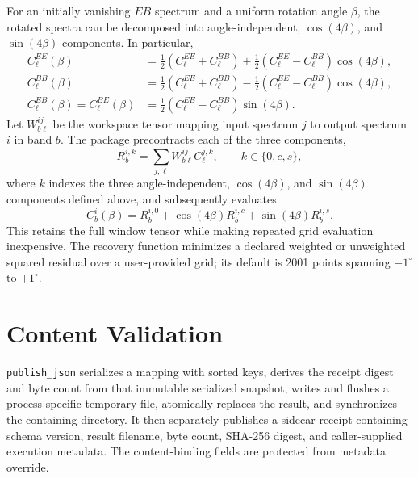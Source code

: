\documentclass[11pt]{article}
\begin{document}
For an initially vanishing \(EB\) spectrum and a uniform rotation angle
\(\beta\), the rotated spectra can be decomposed into angle-independent,
\(\cos(4\beta)\), and \(\sin(4\beta)\) components.  In particular,
\begin{align}
 C_\ell^{EE}(\beta)
   &= \tfrac12(C_\ell^{EE}+C_\ell^{BB})
    + \tfrac12(C_\ell^{EE}-C_\ell^{BB})\cos(4\beta),\\
 C_\ell^{BB}(\beta)
   &= \tfrac12(C_\ell^{EE}+C_\ell^{BB})
    - \tfrac12(C_\ell^{EE}-C_\ell^{BB})\cos(4\beta),\\
 C_\ell^{EB}(\beta)=C_\ell^{BE}(\beta)
   &= \tfrac12(C_\ell^{EE}-C_\ell^{BB})\sin(4\beta).
\end{align}
Let \(W_{b\ell}^{ij}\) be the workspace tensor mapping input spectrum \(j\)
to output spectrum \(i\) in band \(b\).  The package precontracts each of the
three components,
\begin{equation}
 R_{b}^{i,k}=\sum_{j,\ell}W_{b\ell}^{ij}C_\ell^{j,k},\qquad k\in\{0,c,s\},
\end{equation}
where \(k\) indexes the three angle-independent, \(\cos(4\beta)\), and
\(\sin(4\beta)\) components defined above, and subsequently evaluates
\begin{equation}
 C_b^i(\beta)=R_b^{i,0}
 +\cos(4\beta)R_b^{i,c}+\sin(4\beta)R_b^{i,s}.
\end{equation}
This retains the full window tensor while making repeated grid evaluation
inexpensive.  The recovery function minimizes a declared weighted or
unweighted squared residual over a user-provided grid; its default is 2001
points spanning \(-1^\circ\) to \(+1^\circ\).

\section{Content Validation}

\texttt{publish\_json} serializes a mapping with sorted keys, derives the
receipt digest and byte count from that immutable serialized snapshot, writes and
flushes a process-specific temporary file, atomically replaces the result,
and synchronizes the containing directory.  It then separately publishes a sidecar receipt
containing schema version, result filename, byte count, SHA-256 digest, and
caller-supplied execution metadata.  The content-binding fields are protected
from metadata override.
\end{document}
